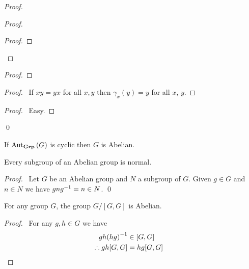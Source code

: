 \begin{proof}
\pf
{}
\begin{proof}
	\begin{proof}
	\end{proof}
\end{proof}
\begin{proof}
\end{proof}
\begin{proof}
	\pf\ If $xy = yx$ for all $x,y$ then $\gamma_x(y) = y$ for all $x$, $y$.
\end{proof}
\begin{proof}
	\pf\ Easy.
\end{proof}
\qed
\end{proof}

\begin{cor}
If $\mathrm{Aut}_{\mathbf{Grp}} \left( {G} \right)$ is cyclic then $G$ is Abelian.
\end{cor}

\begin{prop}
Every subgroup of an Abelian group is normal.
\end{prop}

\begin{proof}
\pf\ Let $G$ be an Abelian group and $N$ a subgroup of $G$. Given $g \in G$ and $n \in N$ we have $gn{g}^{-1} = n \in N$. \qed
\end{proof}

\begin{prop}
For any group $G$, the group $G / [G,G]$ is Abelian.
\end{prop}

\begin{proof}
\pf\ For any $g,h \in G$ we have
\begin{align*}
gh{(hg)}^{-1} & \in [G,G] \\
\therefore gh[G,G] & = hg[G,G] & \relax
\end{align*}
\end{proof}

